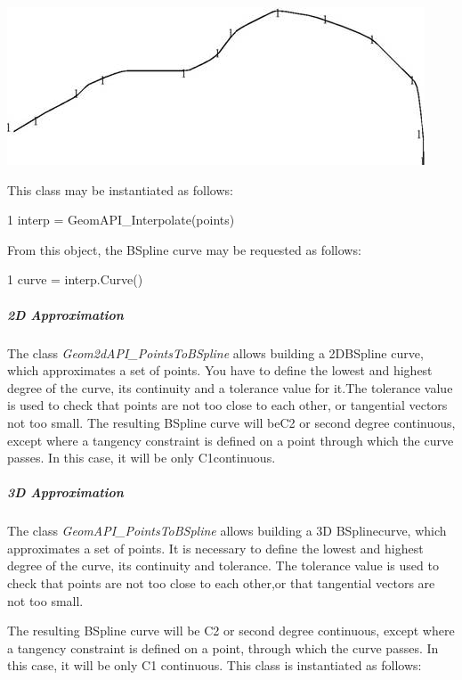 \begin{DoxyImage}
\begin{center}
 \includegraphics[width=\textwidth,height=\textheight/2,keepaspectratio=true]{modeling_data_image003.png}
\end{center}
\caption{Approximation of a B\+Spline from scattered points}
\end{DoxyImage}
 This class may be instantiated as follows\+: 
\begin{DoxyCode}
1 interp = GeomAPI\_Interpolate(points)
\end{DoxyCode}


From this object, the B\+Spline curve may be requested as follows\+: 
\begin{DoxyCode}
1 curve = interp.Curve()
\end{DoxyCode}


\subparagraph*{2D Approximation}

The class {\itshape Geom2d\+A\+P\+I\+\_\+\+Points\+To\+B\+Spline} allows building a 2\+D\+B\+Spline curve, which approximates a set of points. You have to define the lowest and highest degree of the curve, its continuity and a tolerance value for it.\+The tolerance value is used to check that points are not too close to each other, or tangential vectors not too small. The resulting B\+Spline curve will be\+C2 or second degree continuous, except where a tangency constraint is defined on a point through which the curve passes. In this case, it will be only C1continuous.

\subparagraph*{3D Approximation}

The class {\itshape Geom\+A\+P\+I\+\_\+\+Points\+To\+B\+Spline} allows building a 3D B\+Splinecurve, which approximates a set of points. It is necessary to define the lowest and highest degree of the curve, its continuity and tolerance. The tolerance value is used to check that points are not too close to each other,or that tangential vectors are not too small.

The resulting B\+Spline curve will be C2 or second degree continuous, except where a tangency constraint is defined on a point, through which the curve passes. In this case, it will be only C1 continuous. This class is instantiated as follows\+:


